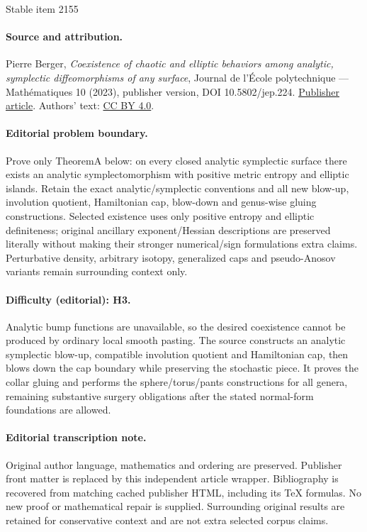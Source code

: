 \documentclass[11pt]{article}
\theoremstyle{definition}
\begin{document}
\begin{center}{\Large Stable item 2155}\end{center}
\paragraph{Source and attribution.}
Pierre Berger, \emph{Coexistence of chaotic and elliptic behaviors among analytic, symplectic diffeomorphisms of any surface}, Journal de l’École polytechnique — Mathématiques 10 (2023), publisher version, DOI 10.5802/jep.224. \href{https://jep.centre-mersenne.org/articles/10.5802/jep.224/}{Publisher article}. Authors' text: \href{https://creativecommons.org/licenses/by/4.0/}{CC BY 4.0}.
\paragraph{Editorial problem boundary.}
Prove only TheoremA below: on every closed analytic symplectic surface there exists an analytic symplectomorphism with positive metric entropy and elliptic islands. Retain the exact analytic/symplectic conventions and all new blow-up, involution quotient, Hamiltonian cap, blow-down and genus-wise gluing constructions. Selected existence uses only positive entropy and elliptic definiteness; original ancillary exponent/Hessian descriptions are preserved literally without making their stronger numerical/sign formulations extra claims. Perturbative density, arbitrary isotopy, generalized caps and pseudo-Anosov variants remain surrounding context only.
\paragraph{Difficulty (editorial): H3.}
Analytic bump functions are unavailable, so the desired coexistence cannot be produced by ordinary local smooth pasting. The source constructs an analytic symplectic blow-up, compatible involution quotient and Hamiltonian cap, then blows down the cap boundary while preserving the stochastic piece. It proves the collar gluing and performs the sphere/torus/pants constructions for all genera, remaining substantive surgery obligations after the stated normal-form foundations are allowed.
\paragraph{Editorial transcription note.}
Original author language, mathematics and ordering are preserved. Publisher front matter is replaced by this independent article wrapper. Bibliography is recovered from matching cached publisher HTML, including its TeX formulas. No new proof or mathematical repair is supplied. Surrounding original results are retained for conservative context and are not extra selected corpus claims.
\clearpage
\end{document}
